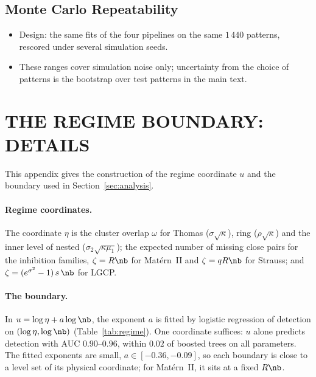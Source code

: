 \subsection{Monte Carlo Repeatability}
\label{app:score-repeat}

\begin{itemize}
  \item Design: the same fits of the four pipelines on the same $1\,440$ patterns, rescored under several simulation
        seeds. 
  \item These ranges cover simulation noise only; uncertainty from the choice of patterns is the bootstrap over test
        patterns in the main text.
\end{itemize}


\section{THE REGIME BOUNDARY: DETAILS}
\label{app:regime}

This appendix gives the construction of the regime coordinate $u$ and the boundary used in Section~\ref{sec:analysis}.

\paragraph{Regime coordinates.} The coordinate $\eta$ is the cluster overlap $\omega$ for Thomas ($\sigma\sqrt\kappa$),
ring ($\rho\sqrt\kappa$) and the inner level of nested ($\sigma_2\sqrt{\kappa\mu_1}$); the expected number of missing
close pairs for the inhibition families, $\zeta=R\nb$ for Mat\'ern~II and $\zeta=qR\nb$ for Strauss; and
$\zeta=(e^{\sigma^2}-1)\,s\,\nb$ for LGCP.

\paragraph{The boundary.} In $u=\log \eta+a\log\nb$, the exponent $a$ is fitted by logistic regression of detection on
$(\log \eta,\log\nb)$ (Table~\ref{tab:regime}). One coordinate suffices: $u$ alone predicts detection with AUC
$0.90$--$0.96$, within $0.02$ of boosted trees on all parameters. The fitted exponents are small,
$a\in[-0.36,-0.09]$, so each boundary is close to a level set of its physical coordinate; for Mat\'ern~II, it sits at a
fixed $R\nb$. 

